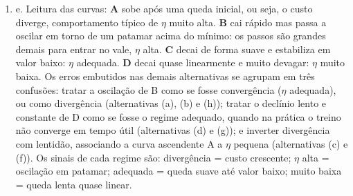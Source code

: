 \documentclass{dlproblemset}
\begin{document}
\begin{enumerate}[1)]
\begin{enumerate}
  Atualização de $\boldsymbol{\theta}_2$:
    $$\boldsymbol{\theta}_{2} = \boldsymbol{\theta}_{1} - \eta \frac{\hat{\mathbf{m}}_{2}}{\sqrt{\hat{\mathbf{v}}_{2}} + \epsilon} = \begin{bmatrix} 5.1\\ 9.9 \end{bmatrix} - 0.1\begin{bmatrix} \frac{-1.47368}{\sqrt{2.49925}}\\ \frac{6.57895}{\sqrt{44.50975}} \end{bmatrix} \approx \begin{bmatrix} 5.1\\ 9.9 \end{bmatrix} - 0.1\begin{bmatrix} -0.9322\\ 0.9861 \end{bmatrix} = \begin{bmatrix} 5.1932\\ 9.8014 \end{bmatrix}$$

Portanto, o valor de $\boldsymbol{\theta}_{2}$ ao seguir a regra de atualização do \textsc{Adam} é:
$$\boldsymbol{\theta}_{2} \approx \begin{bmatrix} 5.193\\ 9.801 \end{bmatrix}$$
    \end{enumerate}

    \item e. Leitura das curvas: \textbf{A} sobe após uma queda inicial, ou seja, o custo diverge, comportamento típico de $\eta$ muito alta. \textbf{B} cai rápido mas passa a oscilar em torno de um patamar acima do mínimo: os passos são grandes demais para entrar no vale, $\eta$ alta. \textbf{C} decai de forma suave e estabiliza em valor baixo: $\eta$ adequada. \textbf{D} decai quase linearmente e muito devagar: $\eta$ muito baixa. Os erros embutidos nas demais alternativas se agrupam em três confusões: tratar a oscilação de B como se fosse convergência ($\eta$ adequada), ou como divergência (alternativas (a), (b) e (h)); tratar o declínio lento e constante de D como se fosse o regime adequado, quando na prática o treino não converge em tempo útil (alternativas (d) e (g)); e inverter divergência com lentidão, associando a curva ascendente A a $\eta$ pequena (alternativas (c) e (f)). Os sinais de cada regime são: divergência = custo crescente; $\eta$ alta = oscilação em patamar; adequada = queda suave até valor baixo; muito baixa = queda lenta quase linear.


\end{enumerate}
\end{document}
